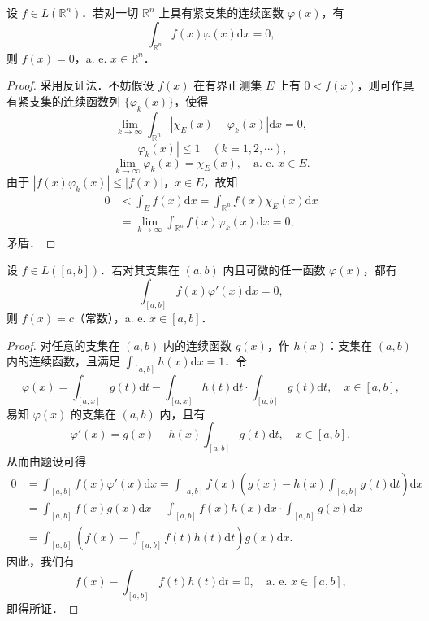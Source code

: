 \documentclass[../../main.tex]{subfiles}
\begin{document}
\begin{example}
设 \( f \in L(\mathbb{R}^n) \)．若对一切 \( \mathbb{R}^n \) 上具有紧支集的连续函数 \( \varphi(x) \)，有
\[
\int_{\mathbb{R}^n} f(x)\varphi(x) \mathrm{d}x = 0,
\]
则 \( f(x) = 0 \)，a. e. \( x \in \mathbb{R}^n \)．
\end{example}
\begin{proof}
采用反证法．不妨假设 \( f(x) \) 在有界正测集 \( E \) 上有 \( 0 < f(x) \)，则可作具有紧支集的连续函数列 \( \{ \varphi_k(x) \} \)，使得
\[
\lim_{k \to \infty} \int_{\mathbb{R}^n} |\chi_E(x) - \varphi_k(x)| \mathrm{d}x = 0,
\]
\[
|\varphi_k(x)| \leqslant 1 \quad (k = 1,2,\cdots),
\]
\[
\lim_{k \to \infty} \varphi_k(x) = \chi_E(x), \quad \text{a. e. } x \in E.
\]
由于 \( |f(x)\varphi_k(x)| \leqslant |f(x)| \)，\( x \in E \)，故知
\begin{align*}
0 &< \int_E f(x) \mathrm{d}x = \int_{\mathbb{R}^n} f(x)\chi_E(x) \mathrm{d}x \\
&= \lim_{k \to \infty} \int_{\mathbb{R}^n} f(x)\varphi_k(x) \mathrm{d}x = 0,
\end{align*}
矛盾．

\end{proof}

\begin{example}
设 \( f \in L([a,b]) \)．若对其支集在 \( (a,b) \) 内且可微的任一函数 \( \varphi(x) \)，都有
\[
\int_{[a,b]} f(x)\varphi'(x) \mathrm{d}x = 0,
\]
则 \( f(x) = c \)（常数），a. e. \( x \in [a,b] \)．
\end{example}
\begin{proof}
对任意的支集在 \( (a,b) \) 内的连续函数 \( g(x) \)，作 \( h(x) \)：支集在 \( (a,b) \) 内的连续函数，且满足 \( \int_{[a,b]} h(x) \mathrm{d}x = 1 \)．令
\[
\varphi(x) = \int_{[a,x]} g(t) \mathrm{d}t - \int_{[a,x]} h(t) \mathrm{d}t \cdot \int_{[a,b]} g(t) \mathrm{d}t, \quad x \in [a,b],
\]
易知 \( \varphi(x) \) 的支集在 \( (a,b) \) 内，且有
\[
\varphi'(x) = g(x) - h(x)\int_{[a,b]} g(t) \mathrm{d}t, \quad x \in [a,b],
\]
从而由题设可得
\begin{align*}
0 &= \int_{[a,b]} f(x)\varphi'(x) \mathrm{d}x = \int_{[a,b]} f(x)\left( g(x) - h(x)\int_{[a,b]} g(t) \mathrm{d}t \right) \mathrm{d}x \\
&= \int_{[a,b]} f(x)g(x) \mathrm{d}x - \int_{[a,b]} f(x)h(x) \mathrm{d}x \cdot \int_{[a,b]} g(x) \mathrm{d}x \\
&= \int_{[a,b]} \left( f(x) - \int_{[a,b]} f(t)h(t) \mathrm{d}t \right) g(x) \mathrm{d}x.
\end{align*}
因此，我们有
\[
f(x) - \int_{[a,b]} f(t)h(t) \mathrm{d}t = 0, \quad \text{a. e. } x \in [a,b],
\]
即得所证．

\end{proof}
\end{document}
